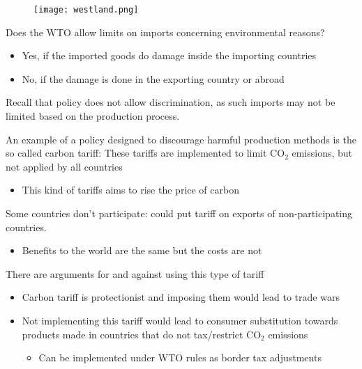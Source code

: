 \documentclass{beamer}
\begin{document}
\begin{frame}
  \begin{figure}
    \texttt{[image: westland.png]}
  \end{figure}
\end{frame}

\begin{frame}
 Does the WTO allow limits on imports concerning environmental reasons?
 \begin{itemize}
   \item Yes, if the imported goods do damage inside the importing countries
   \item No, if the damage is done in the exporting country or abroad
 \end{itemize}
 \medskip
 Recall that policy does not allow discrimination, as such imports may not be limited based on the production process.
\end{frame}

\begin{frame}
 An example of a policy designed to discourage harmful production methods is the so called carbon tariff: These tariffs are implemented to limit CO$_2$ emissions, but not applied by all countries
 \begin{itemize}
   \item This kind of tariffs aims to rise the price of carbon
 \end{itemize}
 \medskip
 Some countries don't participate: could put tariff on exports of non-participating countries.
 \begin{itemize}
   \item Benefits to the world are the same but the costs are not
 \end{itemize}
\end{frame}

\begin{frame}
 There are arguments for and against using this type of tariff
 \begin{itemize}
   \item Carbon tariff is protectionist and imposing them would lead to trade wars   
   \medskip
   \item Not implementing this tariff would lead to consumer substitution towards products made in countries that do not tax/restrict CO$_2$ emissions
   \begin{itemize}
     \item Can be implemented under WTO rules as border tax adjustments   
   \end{itemize}   
 \end{itemize}
\end{frame}
\end{document}
